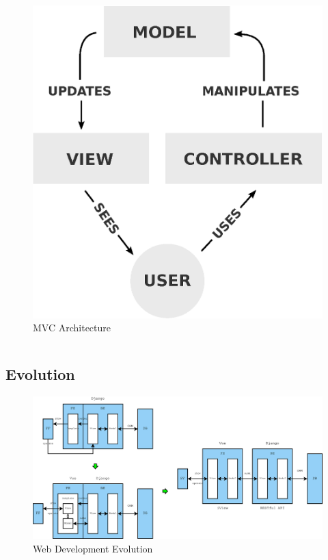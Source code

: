\documentclass{beamer}
\begin{document}
\begin{frame}
\begin{columns}[c]
    \begin{figure}
      \centering
      \includegraphics[width=0.90\linewidth]{mvc_process}
      \caption{MVC Architecture}
    \end{figure}

  \end{columns}
\end{frame}

\subsection{Evolution} %

\begin{frame}
  \begin{figure}
    \centering
    \includegraphics[width=1.05\linewidth]{web_evo}
    \caption{Web Development Evolution}
  \end{figure}
\end{frame}
\end{document}
